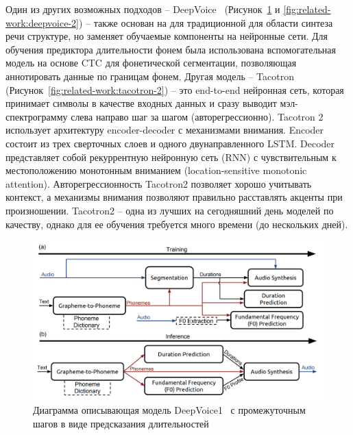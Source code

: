 Один из других возможных подходов -- DeepVoice~\cite{deepvoice1, deepvoice2} (Рисунок~\ref{fig:related-work:deepvoice-1} и \ref{fig:related-work:deepvoice-2}) -- также основан на для традиционной для области синтеза речи структуре, но заменяет обучаемые компоненты на нейронные сети. Для обучения предиктора длительности фонем была использована вспомогательная модель на основе CTC для фонетической сегментации, позволяющая аннотировать данные по границам фонем. Другая модель -- Tacotron~\cite{tacotron1,tacotron2} (Рисунок~\ref{fig:related-work:tacotron-2}) -- это end-to-end нейронная сеть, которая принимает символы в качестве входных данных и сразу выводит мэл-спектрограмму слева направо шаг за шагом (авторегрессионно). Tacotron 2 использует архитектуру encoder-decoder с механизмами внимания. Encoder состоит из трех сверточных слоев и одного двунаправленного LSTM. Decoder представляет собой рекуррентную нейронную сеть (RNN) с чувствительным к местоположению монотонным вниманием (location-sensitive monotonic attention). Авторегрессионность Tacotron2 позволяет хорошо учитывать контекст, а механизмы внимания позволяют правильно расставлять акценты при произношении. Tacotron2 -- одна из лучших на сегодняшний день моделей по качеству, однако для ее обучения требуется много времени (до нескольких дней).

\begin{figure}[!ht]
\centering
\includegraphics[width=1.0\textwidth]{images/related-work/deepvoice-1.png}
\caption{Диаграмма описывающая модель DeepVoice1~\cite{deepvoice1} с промежуточным шагов в виде предсказания длительностей}
\label{fig:related-work:deepvoice-1}
\end{figure}


